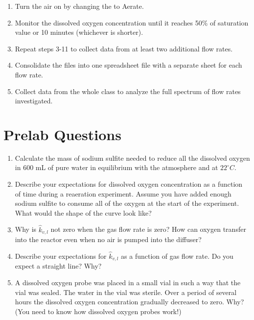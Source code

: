 \documentclass[letterpaper,10pt,english]{sphinxmanual}
\begin{document}
\begin{enumerate}
\item {} 
Turn the air on by changing the  to Aerate.

\item {} 
Monitor the dissolved oxygen concentration until it reaches 50\% of saturation value or 10 minutes (whichever is shorter).

\item {} 
Repeat steps 3-11 to collect data from at least two additional flow rates.

\item {} 
Consolidate the files into one spreadsheet file with a separate sheet for each flow rate.

\item {} 
Collect data from the whole class to analyze the full spectrum of flow rates investigated.

\end{enumerate}


\section{Prelab Questions}
\label{\detokenize{Gas_Transfer/Gas_Transfer:prelab-questions}}\label{\detokenize{Gas_Transfer/Gas_Transfer:heading-gas-transfer-pre-laboratory-questions}}\begin{enumerate}
\item {} 
Calculate the mass of sodium sulfite needed to reduce all the dissolved oxygen in 600 mL of pure water in equilibrium with the atmosphere and at \(22^\circ C\).

\item {} 
Describe your expectations for dissolved oxygen concentration as a function of time during a reaeration experiment.  Assume you have added enough sodium sulfite to consume all of the oxygen at the start of the experiment. What would the shape of the curve look like?

\item {} 
Why is \(\hat{k}_{v,l}\) not zero when the gas flow rate is zero? How can oxygen transfer into the reactor even when no air is pumped into the diffuser?

\item {} 
Describe your expectations for \(\hat{k}_{v,l}\) as a function of gas flow rate. Do you expect a straight line? Why?

\item {} 
A dissolved oxygen probe was placed in a small vial in such a way that the vial was sealed. The water in the vial was sterile. Over a period of several hours the dissolved oxygen concentration gradually decreased to zero. Why? (You need to know how dissolved oxygen probes work!)

\end{enumerate}
\end{document}
